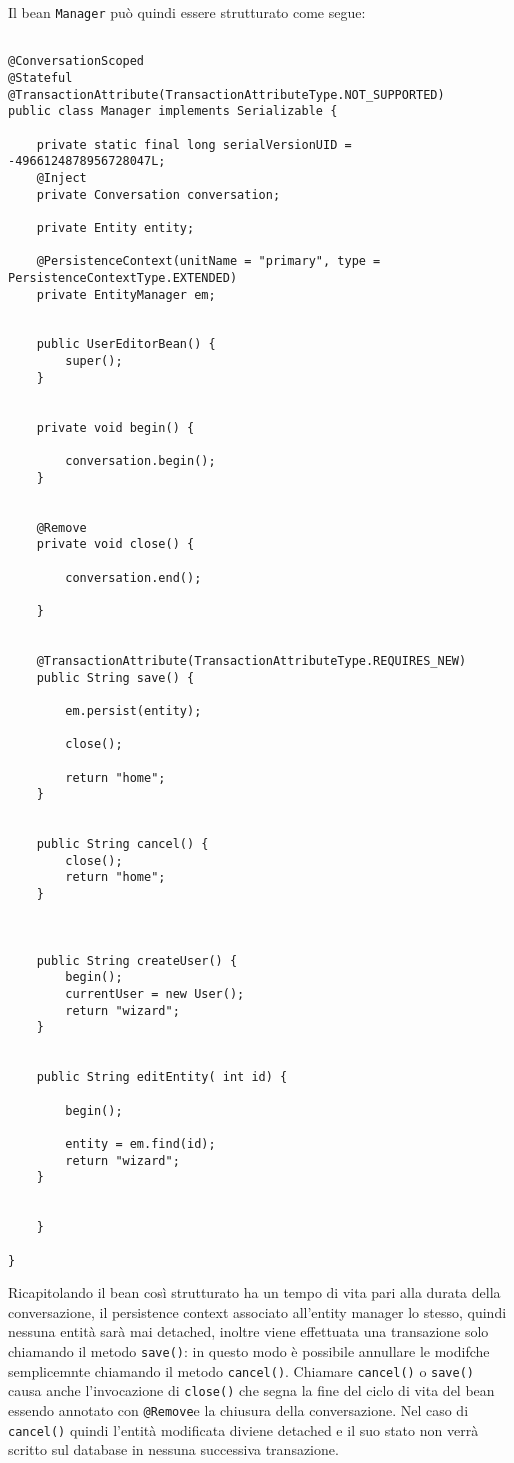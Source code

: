 Il bean \texttt{Manager} può quindi essere strutturato come segue:

\begin{lstlisting}
 
@ConversationScoped
@Stateful
@TransactionAttribute(TransactionAttributeType.NOT_SUPPORTED)
public class Manager implements Serializable {

	private static final long serialVersionUID = -4966124878956728047L;
	@Inject
	private Conversation conversation;

	private Entity entity;

	@PersistenceContext(unitName = "primary", type = PersistenceContextType.EXTENDED)
	private EntityManager em;


	public UserEditorBean() {
		super();
	}


	private void begin() {

		conversation.begin();
	}


	@Remove
	private void close() {

		conversation.end();

	}


	@TransactionAttribute(TransactionAttributeType.REQUIRES_NEW)
	public String save() {
		
		em.persist(entity);
		
		close();

		return "home";
	}


	public String cancel() {
		close();
		return "home";
	}


	
	public String createUser() {
		begin();
		currentUser = new User();
		return "wizard";
	}


	public String editEntity( int id) {

		begin();

		entity = em.find(id);
		return "wizard";
	}


	}

}
\end{lstlisting}

Ricapitolando il bean così strutturato ha un tempo di vita pari alla durata della conversazione, il persistence context associato all'entity manager lo stesso, quindi nessuna entità sarà mai detached, inoltre viene effettuata una
transazione solo chiamando il metodo \texttt{save()}: in questo modo è possibile annullare le modifche semplicemnte chiamando il metodo \texttt{cancel()}. Chiamare \texttt{cancel()} o \texttt{save()} causa
anche l'invocazione di \texttt{close()} che segna la fine del ciclo di vita del bean essendo annotato con \texttt{@Remove}e la chiusura della conversazione.
Nel caso di \texttt{cancel()} quindi l'entità modificata diviene detached e il suo stato non verrà scritto sul database in nessuna successiva transazione.




